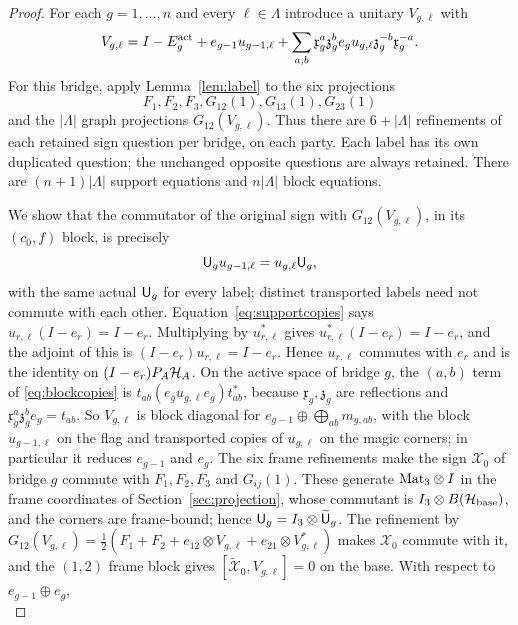 \begin{proof}
For each $g=1,\ldots,n$ and every $\ell\in\Lambda$ introduce a unitary $V_{g,\ell}$ with
\begin{equation}\label{eq:blockcopies}
 V_{g,\ell}=I-E^{\rm act}_g+e_{g-1}u_{g-1,\ell}
 +\sum_{a,b}\mathfrak x_g^a\mathfrak z_g^b e_gu_{g,\ell}\mathfrak z_g^{-b}\mathfrak x_g^{-a}.
\end{equation}
For this bridge, apply Lemma~\ref{lem:label} to the six projections
\[
 F_1,F_2,F_3,G_{12}(1),G_{13}(1),G_{23}(1)
\]
and the $|\Lambda|$ graph projections $G_{12}(V_{g,\ell})$. Thus there are $6+|\Lambda|$ refinements of each retained sign question per bridge, on each party. Each label has its own duplicated question; the unchanged opposite questions are always retained. There are $(n+1)|\Lambda|$ support equations and $n|\Lambda|$ block equations.

We show that the commutator of the original sign with $G_{12}(V_{g,\ell})$, in its $(c_0,f)$ block, is precisely
\begin{equation}\label{eq:transportcopies}
 {\mathsf U}_gu_{g-1,\ell}=u_{g,\ell}{\mathsf U}_g,
\end{equation}
with the same actual ${\mathsf U}_g$ for every label; distinct transported labels need not commute with each other. Equation~\eqref{eq:supportcopies} says $u_{r,\ell}(I-e_r)=I-e_r$. Multiplying by $u_{r,\ell}^*$ gives $u_{r,\ell}^*(I-e_r)=I-e_r$, and the adjoint of this is $(I-e_r)u_{r,\ell}=I-e_r$. Hence $u_{r,\ell}$ commutes with $e_r$ and is the identity on $(I-e_r)P_A\mathcal H_A$. On the active space of bridge $g$, the $(a,b)$ term of \eqref{eq:blockcopies} is $t_{ab}(e_gu_{g,\ell}e_g)t_{ab}^*$, because $\mathfrak x_g,\mathfrak z_g$ are reflections and $\mathfrak x_g^a\mathfrak z_g^be_g=t_{ab}$. So $V_{g,\ell}$ is block diagonal for $e_{g-1}\oplus\bigoplus_{ab}m_{g,ab}$, with the block $u_{g-1,\ell}$ on the flag and transported copies of $u_{g,\ell}$ on the magic corners; in particular it reduces $e_{g-1}$ and $e_g$. The six frame refinements make the sign $\mathcal X_0$ of bridge $g$ commute with $F_1,F_2,F_3$ and $G_{ij}(1)$. These generate $\mathrm{Mat}_3\otimes I$ in the frame coordinates of Section~\ref{sec:projection}, whose commutant is $I_3\otimes B(\mathcal H_{\rm base})$, and the corners are frame-bound; hence ${\mathsf U}_g=I_3\otimes\widetilde {\mathsf U}_g$. The refinement by $G_{12}(V_{g,\ell})=\frac12(F_1+F_2+e_{12}\otimes V_{g,\ell}+e_{21}\otimes V_{g,\ell}^*)$ makes $\mathcal X_0$ commute with it, and the $(1,2)$ frame block gives $[\widetilde{\mathcal X}_0,V_{g,\ell}]=0$ on the base. With respect to $e_{g-1}\oplus e_g$,
\[
\]
\end{proof}
